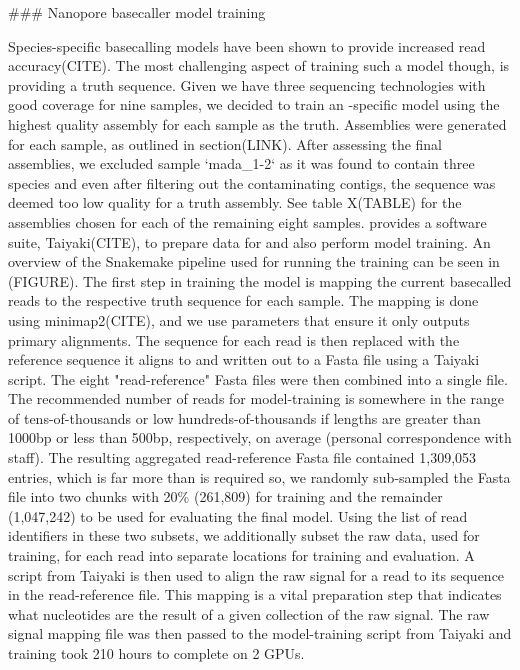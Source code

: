 \begin{markdown}

### Nanopore basecaller model training

Species-specific \ont{} basecalling models have been shown to provide increased read accuracy(CITE). The most challenging aspect of training such a model though, is providing a truth sequence. Given we have three sequencing technologies with good coverage for nine samples, we decided to train an \mtb-specific model using the highest quality assembly for each sample as the truth.  
Assemblies were generated for each sample, as outlined in section(LINK). After assessing the final assemblies, we excluded sample `mada_1-2` as it was found to contain three species and even after filtering out the contaminating contigs, the \mtb{} sequence was deemed too low quality for a truth assembly. See table X(TABLE) for the assemblies chosen for each of the remaining eight samples.  
\ont{} provides a software suite, Taiyaki(CITE), to prepare data for and also perform model training. An overview of the Snakemake pipeline used for running the training can be seen in (FIGURE). The first step in training the model is mapping the current basecalled reads to the respective truth sequence for each sample. The mapping is done using minimap2(CITE), and we use parameters that ensure it only outputs primary alignments. The sequence for each read is then replaced with the reference sequence it aligns to and written out to a Fasta file using a Taiyaki script. The eight "read-reference" Fasta files were then combined into a single file. The recommended number of reads for model-training is somewhere in the range of tens-of-thousands or low hundreds-of-thousands if lengths are greater than 1000bp or less than 500bp, respectively, on average (personal correspondence with \ont{} staff). The resulting aggregated read-reference Fasta file contained 1,309,053 entries, which is far more than is required so, we randomly sub-sampled the Fasta file into two chunks with 20\% (261,809) for training and the remainder (1,047,242) to be used for evaluating the final model. Using the list of read identifiers in these two subsets, we additionally subset the raw data, used for training, for each read into separate locations for training and evaluation. A script from Taiyaki is then used to align the raw signal for a read to its sequence in the read-reference file. This mapping is a vital preparation step that indicates what nucleotides are the result of a given collection of the raw signal. The raw signal mapping file was then passed to the model-training script from Taiyaki and training took 210 hours to complete on 2 GPUs. \\


\end{markdown}
